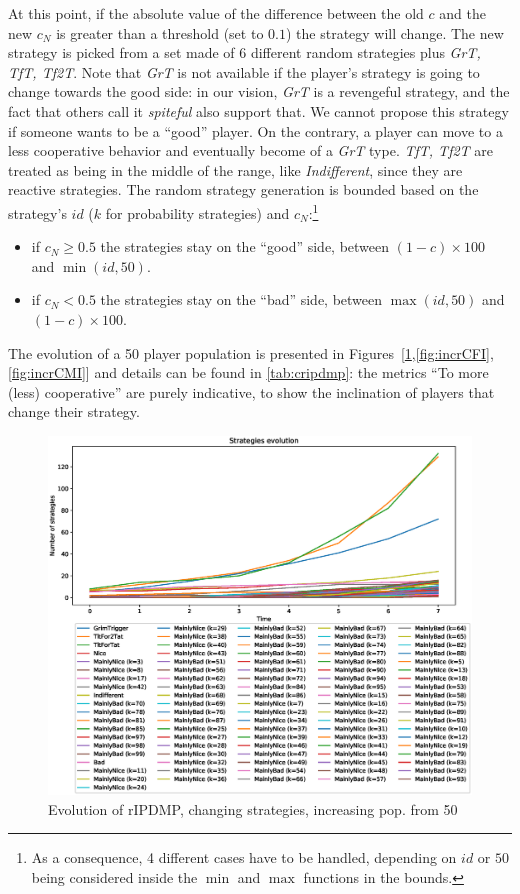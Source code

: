 \documentclass[journal,10pt,twoside]{IEEEtran}
\begin{document}
At this point, if the absolute value of the difference between the old $c$ and the new $c_N$ is greater than a threshold (set to $0.1$) the strategy will change. 
The new strategy is picked from a set made of 6 different random strategies plus \textit{GrT, TfT, Tf2T}.
Note that \textit{GrT} is not available if the player's strategy is going to change towards the good side: in our vision, \textit{GrT} is a revengeful strategy, and the fact that others call it \textit{spiteful} also support that. We cannot propose this strategy if someone wants to be a ``good'' player. On the contrary, a player can move to a less cooperative behavior and eventually become of a \textit{GrT} type.
\textit{TfT, Tf2T} are treated as being in the middle of the range, like \textit{Indifferent}, since they are reactive strategies.
The random strategy generation is bounded based on the strategy's $id$ ($k$ for probability strategies) and $c_N$:\footnote{As a consequence, 4 different cases have to be handled, depending on $id$ or $50$ being considered inside the $\min$ and $\max$ functions in the bounds.}
\begin{itemize}
    \item if $c_N \ge 0.5$ the strategies stay on the ``good'' side, between $(1-c)\times 100$ and $\min(id,50)$.
    \item if $c_N < 0.5$ the strategies stay on the ``bad'' side, between $\max(id,50)$ and $(1-c)\times 100$.
\end{itemize}

The evolution of a 50 player population is presented in Figures~[\ref{fig:incrC},\ref{fig:incrCFI},\ref{fig:incrCMI}] and details can be found in \autoref{tab:cripdmp}: the metrics ``To more (less) cooperative'' are purely indicative, to show the inclination of players that change their strategy.

\begin{figure}[!ht]
    \centering
    \includegraphics[width=1\columnwidth]{../img/cipdmp-incr/alt1/cipdmp-evolution-increasing-pop-50}
    \caption{Evolution of rIPDMP, changing strategies, increasing pop. from 50}
    \label{fig:incrC}
\end{figure}
\end{document}
